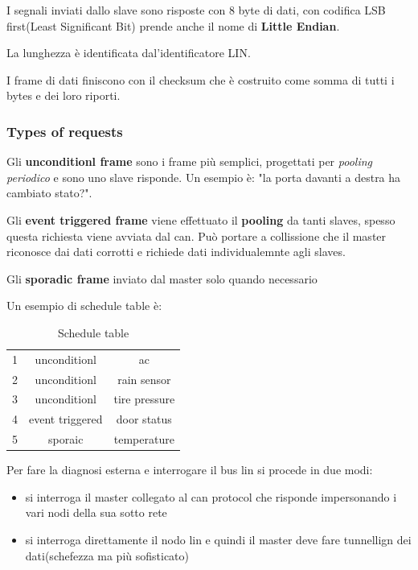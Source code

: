 I segnali inviati dallo slave sono risposte con 8 byte di dati, con codifica LSB first(Least Significant Bit) prende anche il nome di \textbf{Little Endian}.

La lunghezza è identificata dal'identificatore LIN.

I frame di dati finiscono con il checksum che è costruito come somma di tutti i bytes e dei loro riporti.


\subsubsection{Types of requests} %
\label{sec:Types of requests}

Gli \textbf{unconditionl frame} sono i frame più semplici, progettati per \textit{pooling periodico} e sono uno slave risponde.
Un esempio è: "la porta davanti a destra ha cambiato stato?".


Gli \textbf{event triggered frame} viene effettuato il \textbf{pooling} da tanti slaves, spesso questa richiesta viene avviata dal can.
Può portare a collissione che il master riconosce dai dati corrotti e richiede dati individualemnte agli slaves.

Gli \textbf{sporadic frame} inviato dal master solo quando necessario


Un esempio di schedule table è:
\begin{table}[!ht]
  \caption{Schedule table}\label{tab:schedule table}
  \begin{center}
    \begin{tabular}[c]{c c c}
      \hline
      1 & unconditionl & ac \\
      2 & unconditionl & rain sensor \\
      3 & unconditionl & tire pressure \\
      4 & event triggered & door status \\
      5 & sporaic & temperature \\
      \hline
    \end{tabular}
  \end{center}
\end{table}






Per fare la diagnosi esterna e interrogare il bus lin si procede in due modi:
\begin{itemize}
  \item si interroga il master collegato al can protocol che risponde impersonando i vari nodi della sua sotto rete
  \item si interroga direttamente il nodo lin e quindi il master deve fare tunnellign dei dati(schefezza ma più sofisticato)
\end{itemize}

